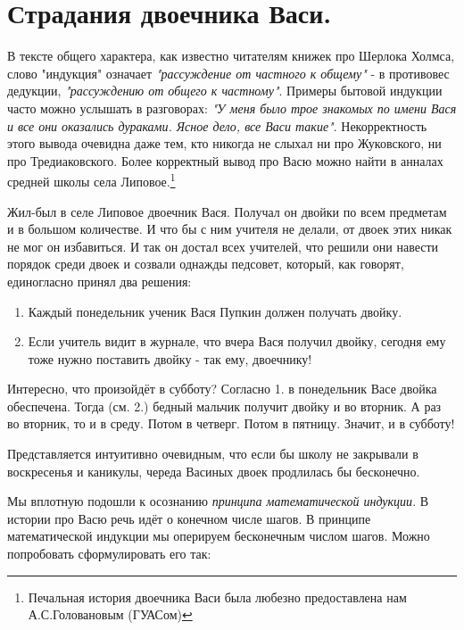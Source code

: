 
\section{Страдания двоечника Васи.}

В тексте общего характера, как известно читателям книжек про Шерлока Холмса, слово "индукция" означает \textit{"рассуждение от частного к общему"} - в противовес дедукции, \textit{"рассуждению от общего к частному"}. Примеры бытовой индукции часто можно услышать в разговорах: \textit{"У меня было трое знакомых по имени Вася и все они оказались дураками. Ясное дело, все Васи такие"}. Некорректность этого вывода очевидна даже тем, кто никогда не слыхал ни про Жуковского, ни про Тредиаковского. Более корректный вывод про Васю можно найти в анналах средней школы села Липовое.\footnote{Печальная история двоечника Васи была любезно предоставлена нам А.С.Головановым (ГУАСом)}

Жил-был в селе Липовое двоечник Вася. Получал он двойки по всем предметам и в большом количестве. И что бы с ним учителя не делали, от двоек этих никак не мог он избавиться. И так он достал
всех учителей, что решили они навести порядок среди двоек и созвали однажды педсовет, который, как говорят, единогласно принял два решения:
\begin{enumerate}
\item Каждый понедельник ученик Вася Пупкин должен получать двойку.
\item Если учитель видит в журнале, что вчера Вася получил двойку, сегодня ему тоже нужно поставить двойку - так ему, двоечнику!
\end{enumerate}

Интересно, что произойдёт в субботу? Согласно 1. в понедельник Васе двойка обеспечена. Тогда (см. 2.) бедный мальчик получит двойку и во вторник. А раз во вторник, то и в среду. Потом в четверг. Потом в пятницу. Значит, и в субботу!

Представляется интуитивно очевидным, что если бы школу не закрывали в воскресенья и каникулы, череда Васиных двоек продлилась бы бесконечно.

Мы вплотную подошли к осознанию \textit{принципа математической индукции}. В истории про Васю речь идёт о конечном числе шагов. В принципе математической индукции мы оперируем бесконечным
числом шагов. Можно попробовать сформулировать его так:


